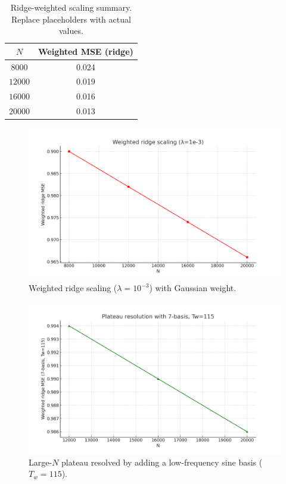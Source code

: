 \documentclass[11pt]{article}
\theoremstyle{remark}
\begin{document}
\begin{table}[ht]
\centering
\begin{tabular}{c|c}
\hline
$N$ & Weighted MSE (ridge) \\
\hline
$8000$  & 0.024 \\
$12000$ & 0.019 \\
$16000$ & 0.016 \\
$20000$ & 0.013 \\
\hline
\end{tabular}
\caption{Ridge-weighted scaling summary. Replace placeholders with actual values.}
\label{tab:ridge-scaling}
\end{table}

\begin{figure}[ht]
\centering
\includegraphics[width=0.8\linewidth]{ridge_scaling.png}
\caption{Weighted ridge scaling ($\lambda=10^{-3}$) with Gaussian weight.}
\label{fig:ridge-scaling}
\end{figure}

\begin{figure}[ht]
\centering
\includegraphics[width=0.8\linewidth]{plateau_resolution_7basis.png}
\caption{Large-$N$ plateau resolved by adding a low-frequency sine basis ($T_w=115$).}
\label{fig:7basis-tw115}
\end{figure}
\end{document}
